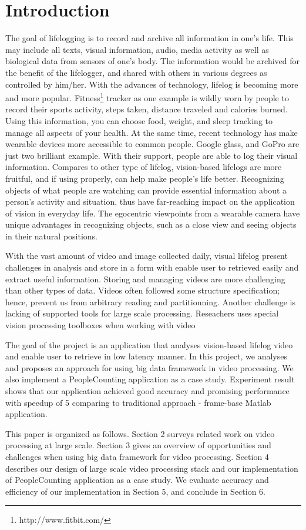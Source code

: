 \section{Introduction}
\label{sec:sec_intro}

The goal of lifelogging is to record and archive all information in one's life. 
This may include all texts, visual information, audio, media activity as well 
as biological data from sensors of one's body. The information would be archived
for the benefit of the lifelogger, and shared with others in various degrees as
controlled by him/her.  With the advances of technology, lifelog is becoming more
 and more popular. Fitness\footnote{http://www.fitbit.com/} tracker as one
 example is wildly worn by people to record  their sports activity, steps taken, distance traveled and calories
 burned.  Using this information, you can choose food, weight, and sleep
 tracking  to manage all aspects of your health.  At the same time, recent 
 technology has make wearable devices more accessible to common people. Google
 glass, and GoPro are just two brilliant example. With their support,  people
 are able to log their visual information.
Compares to other type of lifelog, vision-based lifelogs are more fruitful, and
if using properly, can help make people's life better. Recognizing objects of 
what people are watching can provide essential information about a person's 
activity and situation, thus have far-reaching impact on the application of 
vision in everyday life. The egocentric viewpoints from a wearable camera have
unique advantages in recognizing objects, such as a close view and seeing
objects in their natural positions.

With the vast amount of video and image collected daily, visual lifelog present 
challenges in analysis and store in a form with enable user to retrieved easily 
and extract useful information. Storing and managing videos are more challenging
than other types of data. Videos often followed some structure specification;
hence, prevent us from arbitrary reading and partitionning. Another challenge
is lacking of supported tools for large scale processing. Reseachers uses
special vision processing toolboxes when working with video 

The goal of the project is an application that 
analyses vision-based lifelog video and enable user to retrieve in low
latency manner. In this project, we analyses and proposes an approach for using
big data framework in video processing. We also implement a PeopleCounting
application as a case study. Experiment result shows that our application
achieved good accuracy and promising performance with speedup of 5 comparing to
traditional approach - frame-base Matlab application.

This paper is organized as follows. Section 2 surveys related work on video
processing at large scale. Section 3 gives an overview of opportunities
and challenges when using big data framework for video processing. Section 4
describes our design of large scale video processing stack and our
implementation of PeopleCounting application as a case study. We evaluate
accuracy and efficiency of our implementation in Section 5, and conclude in
Section 6.
